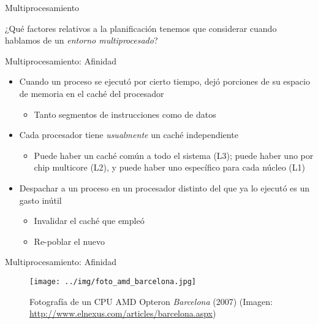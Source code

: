 \documentclass[presentation]{beamer}
\begin{document}
\begin{frame}[label={sec:orgf4b2077}]{Multiprocesamiento}
\begin{center}
¿Qué factores relativos a la planificación tenemos que considerar
cuando hablamos de un \emph{entorno multiprocesado}?
\end{center}
\end{frame}

\begin{frame}[label={sec:org7e082e7}]{Multiprocesamiento: Afinidad}
\begin{itemize}
\item Cuando un proceso se ejecutó por cierto tiempo, dejó porciones de
su espacio de memoria en el caché del procesador
\begin{itemize}
\item Tanto segmentos de instrucciones como de datos
\end{itemize}
\item Cada procesador tiene \emph{usualmente} un caché independiente
\begin{itemize}
\item Puede haber un caché común a todo el sistema (L3); puede haber uno
por chip multicore (L2), y puede haber uno específico para cada
núcleo (L1)
\end{itemize}
\item Despachar a un proceso en un procesador distinto del que ya lo
ejecutó es un gasto inútil
\begin{itemize}
\item Invalidar el caché que empleó
\item Re-poblar el nuevo
\end{itemize}
\end{itemize}
\end{frame}

\begin{frame}[label={sec:org71564e7}]{Multiprocesamiento: Afinidad}
\begin{figure}[htbp]
\centering
\texttt{[image: ../img/foto\_amd\_barcelona.jpg]}
\caption{Fotografía de un CPU AMD Opteron \emph{Barcelona} (2007) (Imagen: \url{http://www.elnexus.com/articles/barcelona.aspx})}
\end{figure}
\end{frame}
\end{document}
